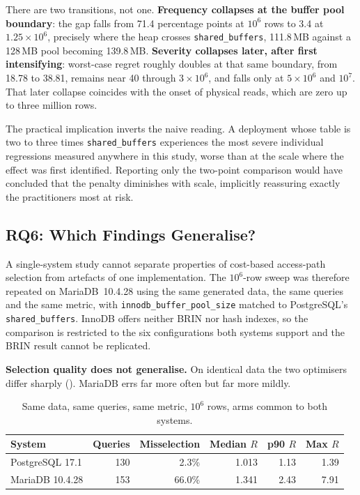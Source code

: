 \documentclass[12pt, a4paper]{article}
\newcommand{\sbuf}{\texttt{shared\_buffers}}
\begin{document}
There are two transitions, not one. \textbf{Frequency collapses at the
buffer pool boundary}: the gap falls from 71.4 percentage points at
$10^6$ rows to 3.4 at $1.25 \times 10^6$, precisely where the heap
crosses \sbuf{}, 111.8\,MB against a 128\,MB pool becoming 139.8\,MB.
\textbf{Severity collapses later, after first intensifying}: worst-case
regret roughly doubles at that same boundary, from 18.78 to 38.81,
remains near 40 through $3 \times 10^6$, and falls only at
$5 \times 10^6$ and $10^7$. That later collapse coincides with the onset
of physical reads, which are zero up to three million rows.

The practical implication inverts the naive reading. A deployment whose
table is two to three times \sbuf{} experiences the most severe
individual regressions measured anywhere in this study, worse than at
the scale where the effect was first identified. Reporting only the
two-point comparison would have concluded that the penalty diminishes
with scale, implicitly reassuring exactly the practitioners most at risk.

\subsection{RQ6: Which Findings Generalise?}
\label{sec:crossdbms}

A single-system study cannot separate properties of cost-based
access-path selection from artefacts of one implementation. The
$10^6$-row sweep was therefore repeated on MariaDB~10.4.28 using the
same generated data, the same queries and the same metric, with
\texttt{innodb\_buffer\_pool\_size} matched to PostgreSQL's \sbuf{}.
InnoDB offers neither BRIN nor hash indexes, so the comparison is
restricted to the six configurations both systems support and the BRIN
result cannot be replicated.

\textbf{Selection quality does not generalise.} On identical data the
two optimisers differ sharply (). MariaDB errs far
more often but far more mildly.

\begin{table}[htbp]
\centering
\caption{Same data, same queries, same metric, $10^6$ rows, arms common
to both systems.}
\label{tab:crossdbms}
\small
\begin{tabular}{@{}lrrrrr@{}}
\toprule
\textbf{System} & \textbf{Queries} & \textbf{Misselection} & \textbf{Median $R$} & \textbf{p90 $R$} & \textbf{Max $R$} \\
\midrule
PostgreSQL 17.1 & 130 & 2.3\% & 1.013 & 1.13 & 1.39 \\
MariaDB 10.4.28 & 153 & 66.0\% & 1.341 & 2.43 & 7.91 \\
\bottomrule
\end{tabular}
\end{table}
\end{document}
